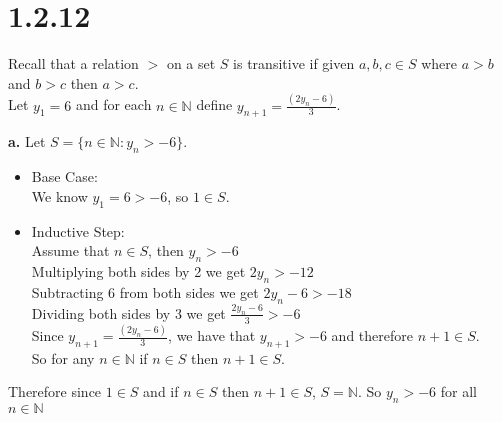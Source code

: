 \documentclass{article}
\begin{document}
\newpage
\section*{1.2.12}
\begin{center}
    Recall that a relation $>$ on a set $S$ is transitive if given $a, b, c\in S$ where $a > b$ and $b > c$ then $a > c$.
    \\Let $y_1 = 6$ and for each $n\in \mathbb{N}$ define $y_{n+1} = \frac{(2y_n - 6)}{3}$.
\end{center}

{\Large \textbf{a.}} Let $S = \{n\in \mathbb{N}: y_n > -6\}$.
\begin{center}
    \doublespacing
    \begin{itemize}
        \item Base Case: 
        \\We know $y_1 = 6 > -6$, so $1\in S$.
        \item Inductive Step:
        \\Assume that $n\in S$, then $y_n > -6$
        \\Multiplying both sides by 2 we get $2y_n > -12$
        \\Subtracting 6 from both sides we get $2y_n - 6 > -18$
        \\Dividing both sides by 3 we get $\frac{2y_n - 6}{3} > -6$
        \\Since $y_{n+1} = \frac{(2y_n - 6)}{3}$, we have that $y_{n+1} > -6$ and therefore $n+1\in S$.
        \\So for any $n\in \mathbb{N}$ if $n\in S$ then $n+1\in S$.
    \end{itemize}
    Therefore since $1\in S$ and if $n\in S$ then $n+1\in S$, $S = \mathbb{N}$. So $y_n > -6$ for all $n\in \mathbb{N}$ \qedsymbol
\end{center}
\end{document}
